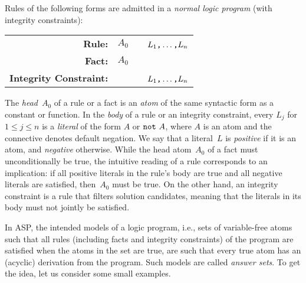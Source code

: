 Rules of the following forms are admitted in a 
\emph{normal logic program} (with integrity constraints):
\par
\medskip
\begin{tabular}{rl@{}l}\label{eq:normal:rule}
\textbf{Rule:} & $A_0$&~\code{:-}~$L_1\text{\texttt{,}}\dots\text{\texttt{,}}L_n$\code{.}
\\
\textbf{Fact:} & $A_0$&\code{.}
\\
\textbf{Integrity Constraint:} & &~\code{:-}~$L_1\texttt{,}\dots\texttt{,}L_n$\code{.}
\end{tabular}
%
%
%
\par
\medskip
\noindent
The \emph{head}~$A_0$ of a rule or a fact is an \emph{atom} of the same 
syntactic form as a constant or function.
%
In the \emph{body} of a rule or an integrity constraint,
every $L_j$ for $1\leq j\leq n$ is a \emph{literal} of the form $A$ or $\texttt{not}~A$,
where $A$ is an atom and
the connective  denotes default negation.
%
%
We say that a literal~$L$ is \emph{positive} if it is an atom,
and \emph{negative} otherwise.
While the head atom~$A_0$ of a fact must unconditionally be true,
the intuitive reading of a rule corresponds to an implication:
if all positive literals in the rule's body are true and all negative
literals are satisfied, then~$A_0$ must be true.
On the other hand, an integrity constraint is a rule that filters solution candidates,
meaning that the literals in its body must not jointly be satisfied.

In ASP, the intended models of a logic program, i.e.,
sets of variable-free atoms such that all rules
(including facts and integrity constraints)
of the program are satisfied when the atoms in the set are true, 
are such that every true atom has an (acyclic) derivation from the program.
Such models are called \emph{answer sets}.
To get the idea, let us consider some small examples.

